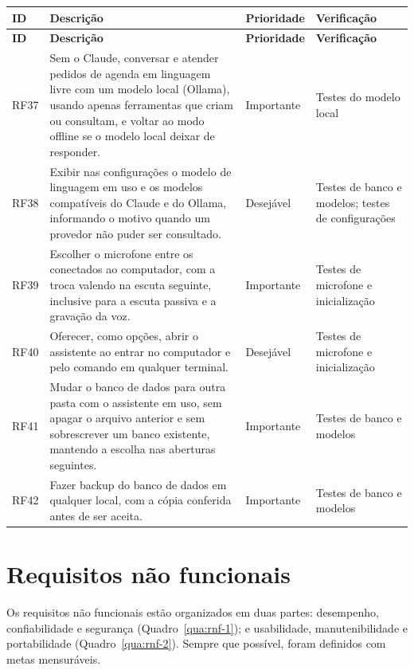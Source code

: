 \begin{singlespace}
\label{qua:rf-novos}
\small
\begin{tabularx}{\textwidth}{|C{1.25cm}|L|C{2.0cm}|P{3.2cm}|}
\hline
\textbf{ID} & \textbf{Descrição} & \textbf{Prioridade} & \textbf{Verificação} \\ \hline
\endfirsthead
\hline
\textbf{ID} & \textbf{Descrição} & \textbf{Prioridade} & \textbf{Verificação} \\ \hline
\endhead
RF37 & Sem o Claude, conversar e atender pedidos de agenda em linguagem livre com um modelo local
       (Ollama), usando apenas ferramentas que criam ou consultam, e voltar ao modo offline se o modelo
       local deixar de responder. & Importante & Testes do modelo local \\ \hline
RF38 & Exibir nas configurações o modelo de linguagem em uso e os modelos compatíveis do Claude e do
       Ollama, informando o motivo quando um provedor não puder ser consultado. & Desejável & Testes de banco e modelos; testes de configurações \\ \hline
RF39 & Escolher o microfone entre os conectados ao computador, com a troca valendo na escuta seguinte,
       inclusive para a escuta passiva e a gravação da voz. & Importante & Testes de microfone e inicialização \\ \hline
RF40 & Oferecer, como opções, abrir o assistente ao entrar no computador e pelo comando
        em qualquer terminal. & Desejável & Testes de microfone e inicialização \\ \hline
RF41 & Mudar o banco de dados para outra pasta com o assistente em uso, sem apagar o arquivo anterior e
       sem sobrescrever um banco existente, mantendo a escolha nas aberturas seguintes. & Importante & Testes de banco e modelos \\ \hline
RF42 & Fazer backup do banco de dados em qualquer local, com a cópia conferida antes de ser aceita. & Importante & Testes de banco e modelos \\ \hline
\end{tabularx}
\end{singlespace}

\section{Requisitos não funcionais}

Os requisitos não funcionais estão organizados em duas partes: desempenho, confiabilidade e segurança
(Quadro~\ref{qua:rnf-1}); e usabilidade, manutenibilidade e portabilidade (Quadro~\ref{qua:rnf-2}).
Sempre que possível, foram definidos com metas mensuráveis.

